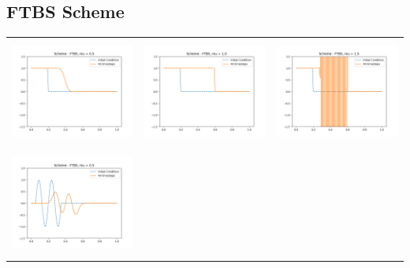 \documentclass[a4paper,twoside,11pt]{article}
\begin{document}
    \subsection*{FTBS Scheme}
    \begin{table}[!h]
        \centering
        \begin{tabular}{ | c | m{5cm} | m{5cm} | }
          \hline
          \begin{minipage}{.3\textwidth}
            \includegraphics[width=\linewidth, height=3.5cm]{../plots/scheme3-IC1-mu0_5.png}
          \end{minipage}
          &
          \begin{minipage}{.3\textwidth}
            \includegraphics[width=\linewidth, height=3.5cm]{../plots/scheme3-IC1-mu1_0.png}
          \end{minipage}
          &
          \begin{minipage}{.3\textwidth}
            \includegraphics[width=\linewidth, height=3.5cm]{../plots/scheme3-IC1-mu1_5.png}
          \end{minipage} \\
          \begin{minipage}{.3\textwidth}
            \includegraphics[width=\linewidth, height=3.5cm]{../plots/scheme3-IC2-mu0_5.png}

\end{minipage}
\end{tabular}
\end{table}
\end{document}
